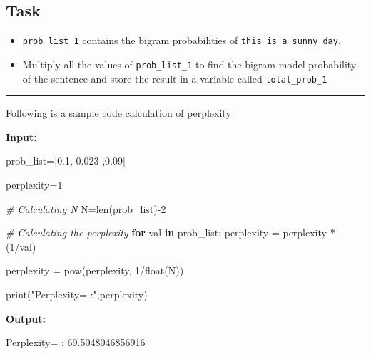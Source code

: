 \documentclass[11pt]{article}
\newenvironment{Shaded}{}{}
\newcommand{\KeywordTok}[1]{\textcolor[rgb]{0.00,0.44,0.13}{\textbf{{#1}}}}
\newcommand{\DecValTok}[1]{\textcolor[rgb]{0.25,0.63,0.44}{{#1}}}
\newcommand{\FloatTok}[1]{\textcolor[rgb]{0.25,0.63,0.44}{{#1}}}
\newcommand{\StringTok}[1]{\textcolor[rgb]{0.25,0.44,0.63}{{#1}}}
\newcommand{\CommentTok}[1]{\textcolor[rgb]{0.38,0.63,0.69}{\textit{{#1}}}}
\newcommand{\NormalTok}[1]{{#1}}
\newcommand{\ControlFlowTok}[1]{\textcolor[rgb]{0.00,0.44,0.13}{\textbf{{#1}}}}
\newcommand{\OperatorTok}[1]{\textcolor[rgb]{0.40,0.40,0.40}{{#1}}}
\newcommand{\BuiltInTok}[1]{{#1}}
\begin{document}
    \hypertarget{task}{%
\subsection{Task}\label{task}}

\begin{itemize}
\item
  \texttt{prob\_list\_1} contains the bigram probabilities of
  \texttt{this\ is\ a\ sunny\ day}.
\item
  Multiply all the values of
  \texttt{\textquotesingle{}prob\_list\_1\textquotesingle{}} to find the
  bigram model probability of the sentence and store the result in a
  variable called \texttt{total\_prob\_1}
\end{itemize}

\begin{center}\rule{0.5\linewidth}{\linethickness}\end{center}

Following is a sample code calculation of perplexity

\textbf{Input:}

\begin{Shaded}
\begin{Highlighting}[]

\NormalTok{prob_list}\OperatorTok{=}\NormalTok{[}\FloatTok{0.1}\NormalTok{, }\FloatTok{0.023}\NormalTok{ ,}\FloatTok{0.09}\NormalTok{]}


\NormalTok{perplexity}\OperatorTok{=}\DecValTok{1}

\CommentTok{# Calculating N}
\NormalTok{N}\OperatorTok{=}\BuiltInTok{len}\NormalTok{(prob_list)}\OperatorTok{-}\DecValTok{2}


\CommentTok{# Calculating the perplexity}
\ControlFlowTok{for}\NormalTok{ val }\KeywordTok{in}\NormalTok{ prob_list:}
\NormalTok{    perplexity }\OperatorTok{=}\NormalTok{ perplexity }\OperatorTok{*}\NormalTok{ (}\DecValTok{1}\OperatorTok{/}\NormalTok{val)}

\NormalTok{perplexity }\OperatorTok{=} \BuiltInTok{pow}\NormalTok{(perplexity, }\DecValTok{1}\OperatorTok{/}\BuiltInTok{float}\NormalTok{(N)) }

\BuiltInTok{print}\NormalTok{(}\StringTok{"Perplexity= :"}\NormalTok{,perplexity)}
\end{Highlighting}
\end{Shaded}

\textbf{Output:}

\begin{Shaded}
\begin{Highlighting}[]
\NormalTok{Perplexity}\OperatorTok{=}\NormalTok{ : }\FloatTok{69.5048046856916}
\end{Highlighting}
\end{Shaded}
\end{document}
